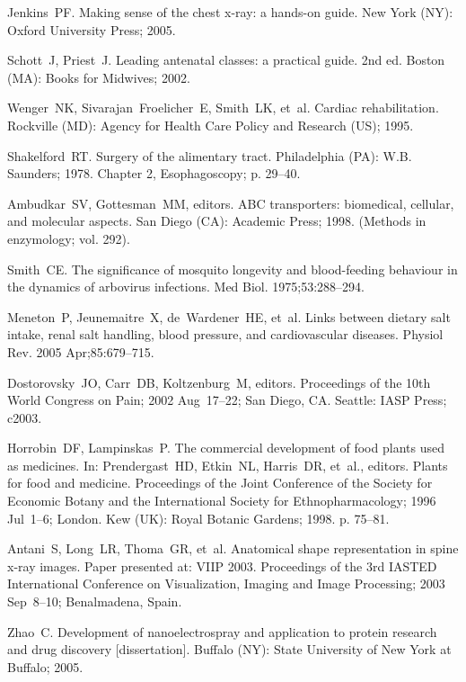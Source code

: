 \documentclass[]{interact}
\theoremstyle{plain}%
\theoremstyle{definition}
\theoremstyle{remark}
\begin{document}
\begin{thebibliography}{99}

Jenkins~PF. Making sense of the chest x-ray: a hands-on guide. New York (NY):
  Oxford University Press; 2005.

Schott~J, Priest~J. Leading antenatal classes: a practical guide. 2nd ed.
  Boston (MA): Books for Midwives; 2002.

Wenger~NK, Sivarajan~Froelicher~E, Smith~LK, et~al. Cardiac rehabilitation.
  Rockville (MD): Agency for Health Care Policy and Research (US); 1995.

Shakelford~RT. Surgery of the alimentary tract. Philadelphia (PA): W.B.
  Saunders; 1978. Chapter 2, Esophagoscopy; p. 29--40.

Ambudkar~SV, Gottesman~MM, editors. {ABC} transporters: biomedical, cellular,
  and molecular aspects. San Diego (CA): Academic Press; 1998. (Methods in
  enzymology; vol. 292).

Smith~CE. The significance of mosquito longevity and blood-feeding behaviour in
  the dynamics of arbovirus infections. Med Biol. 1975;53:288--294.

Meneton~P, Jeunemaitre~X, de~Wardener~HE, et~al. Links between dietary salt
  intake, renal salt handling, blood pressure, and cardiovascular diseases.
  Physiol Rev. 2005 Apr;85:679--715.

Dostorovsky~JO, Carr~DB, Koltzenburg~M, editors. Proceedings of the 10th World
  Congress on Pain; 2002 Aug~17--22; San Diego, CA. Seattle: IASP Press; c2003.

Horrobin~DF, Lampinskas~P. The commercial development of food plants used as
  medicines. In: Prendergast~HD, Etkin~NL, Harris~DR, et~al., editors. Plants
  for food and medicine. Proceedings of the Joint Conference of the Society for
  Economic Botany and the International Society for Ethnopharmacology; 1996
  Jul~1--6; London. Kew (UK): Royal Botanic Gardens; 1998. p. 75--81.

Antani~S, Long~LR, Thoma~GR, et~al. Anatomical shape representation in spine
  x-ray images. Paper presented at: VIIP 2003. Proceedings of the 3rd IASTED
  International Conference on Visualization, Imaging and Image Processing;
  2003 Sep~8--10; Benalmadena, Spain.

Zhao~C. Development of nanoelectrospray and application to protein research and
  drug discovery [dissertation]. Buffalo (NY): State University of New York at
  Buffalo; 2005.


\end{thebibliography}
\end{document}
